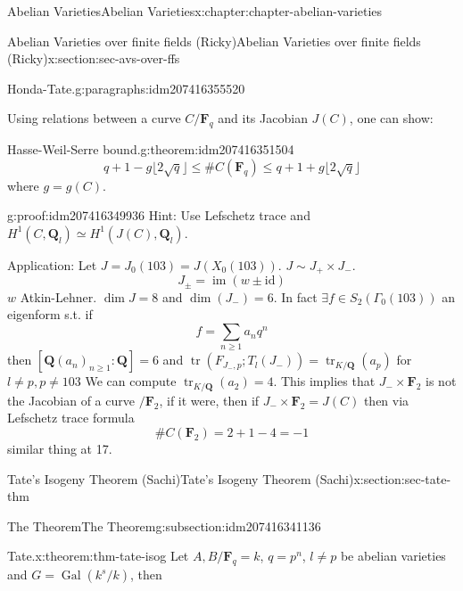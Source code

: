 \documentclass[oneside,10pt,]{book}
\numberwithin{equation}{section}
\newcommand{\lb}{[}
\newcommand{\rb}{]}
\newcommand{\QQ}{\mathbf{Q}}
\newcommand{\FF}{\mathbf{F}}
\newcommand{\id}{\mathrm{id}}
\DeclareMathOperator{\im}{im}
\DeclareMathOperator{\tr}{tr}
\newcommand{\Gal}[2]{\operatorname{Gal}(#1/#2)}
\begin{document}
\begin{chapterptx}{Abelian Varieties}{}{Abelian Varieties}{}{}{x:chapter:chapter-abelian-varieties}
\begin{sectionptx}{Abelian Varieties over finite fields (Ricky)}{}{Abelian Varieties over finite fields (Ricky)}{}{}{x:section:sec-avs-over-ffs}
\begin{paragraphs}{Honda-Tate.}{g:paragraphs:idm207416355520}
\end{paragraphs}%
\par
Using relations between a curve \(C/\FF_q\) and its Jacobian \(J(C) \), one can show:%
\begin{theorem}{Hasse-Weil-Serre bound.}{}{g:theorem:idm207416351504}%
%
\begin{equation*}
q + 1 - g\lfloor 2\sqrt q\rfloor \le \#C(\FF_{q}) \le q + 1 + g\lfloor 2\sqrt q\rfloor
\end{equation*}
where \(g=  g(C)\).%
\end{theorem}
\begin{proofptx}{}{g:proof:idm207416349936}
Hint: Use Lefschetz trace and \(H^1(C, \QQ_l) \simeq H^1(J(C) , \QQ_l)\).%
\end{proofptx}
Application: Let \(J = J_0(103) = J(X_0(103))\). \(J\sim J_+ \times J_-\).%
\begin{equation*}
J_{\pm} = \im(w \pm \id)
\end{equation*}
\(w\) Atkin-Lehner. \(\dim J = 8\) and \(\dim(J_-) = 6\). In fact \(\exists f\in  S_2( \Gamma_0(103))\) an eigenform s.t. if%
\begin{equation*}
f=\sum_{n\ge 1} a_n q^n
\end{equation*}
then \(\lb \QQ(a_n)_{n \ge 1}: \QQ\rb =6\) and \(\tr( F_{J_-,p};  T_l(J_-)) = \tr_{K/\QQ}(a_p)\)  for \(l \ne p, p\ne 103\) We can compute \(\tr_{K/\QQ} ( a_2) = 4\). This implies that \(J_- \times \FF_2\) is not the Jacobian of a curve \(/\FF_2\), if it were, then  if \(J_- \times \FF_2 = J(C)\) then via Lefschetz trace formula%
\begin{equation*}
\#C(\FF_2) = 2+1 - 4 = -1
\end{equation*}
similar thing at 17.%
\end{sectionptx}
%
%
\typeout{************************************************}
\typeout{************************************************}
%
\begin{sectionptx}{Tate's Isogeny Theorem (Sachi)}{}{Tate's Isogeny Theorem (Sachi)}{}{}{x:section:sec-tate-thm}
%
%
\typeout{************************************************}
\typeout{************************************************}
%
\begin{subsectionptx}{The Theorem}{}{The Theorem}{}{}{g:subsection:idm207416341136}
\begin{theorem}{Tate.}{}{x:theorem:thm-tate-isog}%
Let \(A,B/\FF_q = k\), \(q = p^n\), \(l\ne p\) be abelian varieties and \(G = \Gal{k^s}{k}\), then%

\end{theorem}
\end{subsectionptx}
\end{sectionptx}
\end{chapterptx}
\end{document}
